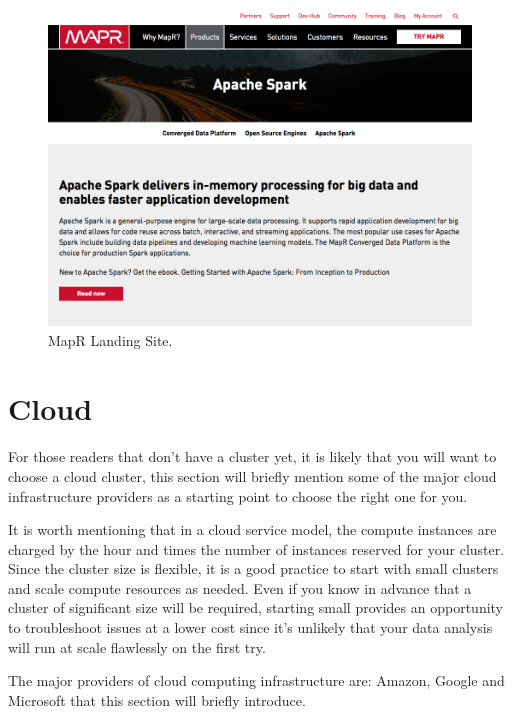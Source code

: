 \documentclass[]{book}
\theoremstyle{definition}
\theoremstyle{definition}
\theoremstyle{definition}
\theoremstyle{remark}
\begin{document}
\begin{figure}

{\centering \includegraphics[width=13.78in]{images/05-clusters-mapr} 

}

\caption{MapR Landing Site.}\label{fig:mapr-spark}
\end{figure}

\hypertarget{cloud}{%
\section{Cloud}\label{cloud}}

For those readers that don't have a cluster yet, it is likely that you
will want to choose a cloud cluster, this section will briefly mention
some of the major cloud infrastructure providers as a starting point to
choose the right one for you.

It is worth mentioning that in a cloud service model, the compute
instances are charged by the hour and times the number of instances
reserved for your cluster. Since the cluster size is flexible, it is a
good practice to start with small clusters and scale compute resources
as needed. Even if you know in advance that a cluster of significant
size will be required, starting small provides an opportunity to
troubleshoot issues at a lower cost since it's unlikely that your data
analysis will run at scale flawlessly on the first try.

The major providers of cloud computing infrastructure are: Amazon,
Google and Microsoft that this section will briefly introduce.
\end{document}
